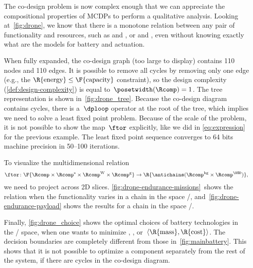 The co-design problem is now complex enough that we can appreciate
the compositional properties of MCDPs to perform a qualitative analysis.
Looking at~\cref{fig:drone}, we know that there is a monotone relation
between any pair of functionality and resources, such as 
and , or  and , even without knowing
exactly what are the models for battery and actuation.

When fully expanded, the co-design graph (too large to display) contains
110 nodes and 110 edges. It is possible to remove all cycles by removing
only one edge (e.g., the $\R{\text{energy}}\leq\text{\F{\text{capacity}}}$
constraint), so the design complexity (\cref{def:design-complexity})
is equal to~$\posetwidth(\Rcomp)=1$. The
tree representation is shown in~\cref{fig:drone_tree}. Because the
co-design diagram contains cycles, there is a~$\dploop$ operator
at the root of the tree, which implies we need to solve a least fixed
point problem. Because of the scale of the problem, it is not possible
to show the map~$\ftor$ explicitly, like we did in \cref{eq:expression}
for the previous example. The least fixed point sequence converges
to 64 bits machine precision in 50--100 iterations.

To visualize the multidimensional relation
\[
    \ftor\colon\F{\Rcomp\times\Rcomp^{\text{s}}\times\Rcomp^{\text{W}}\times\Rcomp^{\text{g}}}\rightarrow\R{\antichains(\Rcomp^{\text{kg}}\times\Rcomp^{\USD})},
\]
we need to project across 2D slices. \cref{fig:drone-endurance-missions}~shows
the relation when the functionality varies in a chain in the space
/, and~\cref{fig:drone-endurance-payload}
shows the results for a chain in the space /.

Finally, \cref{fig:drone_choice} shows the optimal choices of battery
technologies in the / space, when one
wants to minimize , , or~$\left\langle \R{\text{mass}},\R{\text{cost}}\right\rangle $.
The decision boundaries are completely different from those in~\cref{fig:mainbattery}.
This shows that it is not possible to optimize a component separately
from the rest of the system, if there are cycles in the co-design
diagram.

